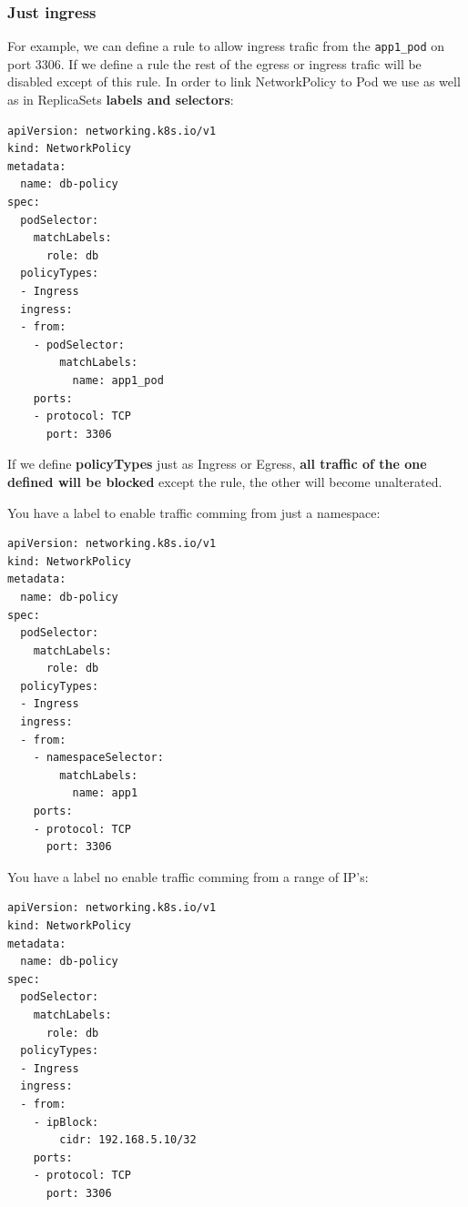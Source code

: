 \documentclass{article}
\newenvironment{blocktemplateII}[1]{%
    \tcolorbox[beamer,%
    noparskip,breakable,
    colframe=Green,%
    colbacklower=LimeGreen!75!LightGreen,%
    title=#1]}%
    {\endtcolorbox}
\newenvironment{codetemplate}[1][]{%
  \mybasecolorbox[#1]
  \itshape
}{%
  \endmybasecolorbox
}
\begin{document}
\subsubsection{Just ingress}
For example, we can define a rule to allow ingress trafic from the \verb|app1_pod| on port 3306. If we define a rule the rest of the egress or ingress trafic will be disabled except of this rule. In order to link NetworkPolicy to Pod we use as well as in ReplicaSets \textbf{labels and selectors}:
\begin{codetemplate}{}
\begin{verbatim}
apiVersion: networking.k8s.io/v1
kind: NetworkPolicy
metadata:
  name: db-policy
spec:
  podSelector:
    matchLabels:
      role: db
  policyTypes:
  - Ingress
  ingress:
  - from:
    - podSelector:
        matchLabels:
          name: app1_pod
    ports:
    - protocol: TCP
      port: 3306
\end{verbatim}
\end{codetemplate}

\begin{blocktemplateII}{NOTE}
If we define \textbf{policyTypes} just as Ingress or Egress, \textbf{all traffic of the one defined will be blocked} except the rule, the other will become unalterated.
\end{blocktemplateII}

You have a label to enable traffic comming from just a namespace:
\begin{codetemplate}{}
\begin{verbatim}
apiVersion: networking.k8s.io/v1
kind: NetworkPolicy
metadata:
  name: db-policy
spec:
  podSelector:
    matchLabels:
      role: db
  policyTypes:
  - Ingress
  ingress:
  - from:
    - namespaceSelector:
        matchLabels:
          name: app1
    ports:
    - protocol: TCP
      port: 3306
\end{verbatim}
\end{codetemplate}

You have a label no enable traffic comming from a range of IP's:
\begin{codetemplate}{}
\begin{verbatim}
apiVersion: networking.k8s.io/v1
kind: NetworkPolicy
metadata:
  name: db-policy
spec:
  podSelector:
    matchLabels:
      role: db
  policyTypes:
  - Ingress
  ingress:
  - from:
    - ipBlock:
        cidr: 192.168.5.10/32
    ports:
    - protocol: TCP
      port: 3306
\end{verbatim}
\end{codetemplate}
\end{document}
